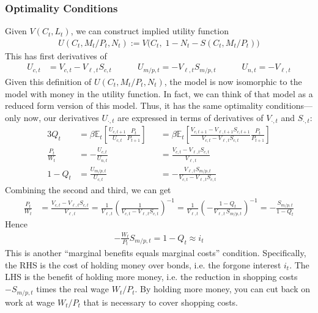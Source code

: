 \documentclass[12pt]{article}
\theoremstyle{plain}
\theoremstyle{definition}
\theoremstyle{remark}
\newcommand{\E}{\mathbb{E}}
\begin{document}
\subsubsection{Optimality Conditions}

Given $V(C_t,L_t)$, we can construct implied utility function
\begin{align*}
  U(C_t,M_t/P_t,N_t)
  := V\big(C_t,\;1-N_t-S(C_t,M_t/P_t)\big)
\end{align*}
This has first derivatives of
\begin{align*}
  U_{c,t}
  &=
  V_{c,t} - V_{\ell,t}S_{c,t}
  \qquad\quad
  U_{m/p,t}
  =
  -V_{\ell,t} S_{m/p,t}
  \qquad\quad
  U_{n,t}
  =
  -V_{\ell,t}
\end{align*}
Given this definition of $U(C_t,M_t/P_t,N_t)$, the model is now
isomorphic to the model with money in the utility function. In fact, we
can think of that model as a reduced form version of this model.
Thus, it has the same optimality conditions---only now, our derivatives
$U_{\cdot,t}$ are expressed in terms of derivatives of $V_{\cdot,t}$ and
$S_{\cdot,t}$:
\begin{alignat*}{3}
  Q_t &=
  \beta \E_t\left[
    \frac{U_{c,t+1}}{U_{c,t}}\frac{P_t}{P_{t+1}}
  \right]
  &&=
  \beta \E_t\left[
    \frac{V_{c,t+1}-V_{\ell,t+1}S_{c,t+1}}{V_{c,t} - V_{\ell,t}S_{c,t}}\frac{P_t}{P_{t+1}}
  \right]
  \\
  \frac{P_t}{W_t}
  &=
  -\frac{U_{c,t}}{U_{n,t}}
  &&=
  \frac{V_{c,t} - V_{\ell,t}S_{c,t}}{V_{\ell,t}}
  \\
  1 - Q_t
  &=
  \frac{U_{m/p,t}}{U_{c,t}}
  &&=
  -\frac{V_{\ell,t} S_{m/p,t}}{V_{c,t} - V_{\ell,t}S_{c,t}}
\end{alignat*}
Combining the second and third, we can get
\begin{align*}
  \frac{P_t}{W_t}
  &=
  \frac{V_{c,t} - V_{\ell,t}S_{c,t}}{V_{\ell,t}}
  =
  \frac{1}{V_{\ell,t}}
  \left(
  \frac{1}{V_{c,t} - V_{\ell,t}S_{c,t}}
  \right)^{-1}
  =
  \frac{1}{V_{\ell,t}}
  \left(
  -\frac{1-Q_t}{V_{\ell,t}\,S_{m/p,t}}
  \right)^{-1}
  =
  - \frac{S_{m/p,t}}{1-Q_t}
\end{align*}
Hence
\begin{align*}
  -\frac{W_t}{P_t}S_{m/p,t}
  =
  1-Q_t
  \approx i_t
\end{align*}
This is another ``marginal benefits equals marginal costs'' condition.
Specifically, the RHS is the cost of holding money over bonds, i.e. the
forgone interest $i_t$. The LHS is the benefit of holding more money,
i.e. the reduction in shopping costs $-S_{m/p,t}$ times the real wage
$W_t/P_t$. By holding more money, you can cut back on work at wage
$W_t/P_t$ that is necessary to cover shopping costs.
\end{document}

